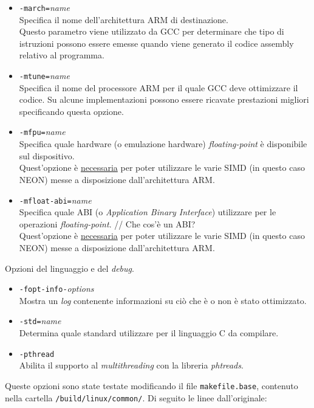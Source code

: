 \begin{itemize}
\item \verb|-march=|\emph{name}\\
Specifica il nome dell'architettura ARM di destinazione.\\
Questo parametro viene utilizzato da GCC per determinare che tipo di istruzioni 
possono essere emesse quando viene generato il codice assembly relativo al 
programma.
\item \verb|-mtune=|\emph{name}\\
Specifica il nome del processore ARM per il quale GCC deve ottimizzare il 
codice. Su alcune implementazioni possono essere ricavate prestazioni migliori 
specificando questa opzione.
\item \verb|-mfpu=|\emph{name}\\
Specifica quale hardware (o emulazione hardware) \emph{floating-point} è 
disponibile sul dispositivo.\\
Quest'opzione è \underline{necessaria} per poter utilizzare le varie SIMD (in 
questo caso NEON) messe a disposizione dall'architettura ARM.
\item \verb|-mfloat-abi=|\emph{name}\\
Specifica quale ABI (o \emph{Application Binary Interface}) utilizzare per le 
operazioni \emph{floating-point}. // Che cos'è un ABI? \\
Quest'opzione è \underline{necessaria} per poter utilizzare le varie SIMD (in 
questo caso NEON) messe a disposizione dall'architettura ARM.
\end{itemize}

Opzioni del linguaggio e del \emph{debug}.

\begin{itemize}
\item \verb|-fopt-info-|\emph{options}\\
Mostra un \emph{log} contenente informazioni su ciò che è o non è stato 
ottimizzato.
\item \verb|-std=|\emph{name}\\
Determina quale standard utilizzare per il linguaggio C da compilare.
\item \verb|-pthread|\\
Abilita il supporto al \emph{multithreading} con la libreria \emph{phtreads}.
\end{itemize}

Queste opzioni sono state testate modificando il file \verb|makefile.base|, 
contenuto nella cartella \verb|/build/linux/common/|. Di seguito le linee 
dall'originale:\\

